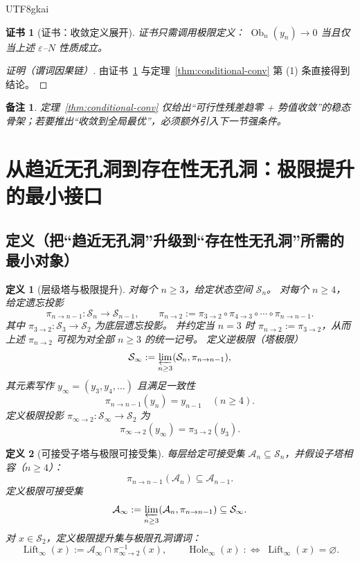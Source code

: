 \documentclass[12pt]{article}
\newtheorem{definition}{定义}[section]
\newtheorem{remark}{备注}[section]
\newtheorem{Certificate}{证书}[section]
\newcommand{\Ob}{\operatorname{Ob}}
\newcommand{\Hole}{\operatorname{Hole}}
\newcommand{\Lift}{\operatorname{Lift}}
\begin{document}
\begin{CJK*}{UTF8}{gkai}
\begin{Certificate}[证书：收敛定义展开]\label{cert:epsilon-stability}
证书只需调用极限定义：
\(
\Ob_n(y_n)\to 0
\)
当且仅当上述 $\varepsilon$--$N$ 性质成立。
\end{Certificate}

\begin{proof}[证明（谓词因果链）]
由证书~\ref{cert:epsilon-stability} 与定理~\ref{thm:conditional-conv} 第 (1) 条直接得到结论。
\end{proof}

\begin{remark}
定理~\ref{thm:conditional-conv} 仅给出“可行性残差趋零 + 势值收敛”的稳态骨架；若要推出“收敛到全局最优”，必须额外引入下一节强条件。
\end{remark}

\section{从趋近无孔洞到存在性无孔洞：极限提升的最小接口}
\label{sec:approx-to-existence-no-hole}

\subsection{定义（把“趋近无孔洞”升级到“存在性无孔洞”所需的最小对象）}

\begin{definition}[层级塔与极限提升]\label{def:tower-limit-lift}
对每个 $n\ge 3$，给定状态空间 $\mathcal S_n$。
对每个 $n\ge 4$，给定遗忘投影
\[
\pi_{n\to n-1}:\mathcal S_n\to \mathcal S_{n-1},
\qquad
\pi_{n\to2}:=\pi_{3\to2}\circ\pi_{4\to3}\circ\cdots\circ\pi_{n\to n-1}.
\]
其中 $\pi_{3\to2}:\mathcal S_3\to\mathcal S_2$ 为底层遗忘投影。
并约定当 $n=3$ 时 $\pi_{n\to2}:=\pi_{3\to2}$，从而上述 $\pi_{n\to2}$ 可视为对全部 $n\ge3$ 的统一记号。
定义逆极限（塔极限）
\[
\mathcal S_\infty:=\varprojlim_{n\ge3}(\mathcal S_n,\pi_{n\to n-1}),
\]
其元素写作 $y_\infty=(y_3,y_4,\dots)$ 且满足一致性
\[
\pi_{n\to n-1}(y_n)=y_{n-1}\quad (n\ge4).
\]
定义极限投影 $\pi_{\infty\to2}:\mathcal S_\infty\to \mathcal S_2$ 为
\[
\pi_{\infty\to2}(y_\infty)=\pi_{3\to2}(y_3).
\]
\end{definition}

\begin{definition}[可接受子塔与极限可接受集]\label{def:acceptable-subtower-limit}
每层给定可接受集 $\mathcal A_n\subseteq \mathcal S_n$，并假设子塔相容（$n\ge4$）：
\[
\pi_{n\to n-1}(\mathcal A_n)\subseteq \mathcal A_{n-1}.
\]
定义极限可接受集
\[
\mathcal A_\infty:=\varprojlim_{n\ge3}(\mathcal A_n,\pi_{n\to n-1})\subseteq \mathcal S_\infty.
\]
对 $x\in\mathcal S_2$，定义极限提升集与极限孔洞谓词：
\[
\Lift_\infty(x):=\mathcal A_\infty\cap \pi_{\infty\to2}^{-1}(x),
\qquad
\Hole_\infty(x)\;:\Longleftrightarrow\;\Lift_\infty(x)=\varnothing.
\]
\end{definition}


\end{CJK*}
\end{document}
